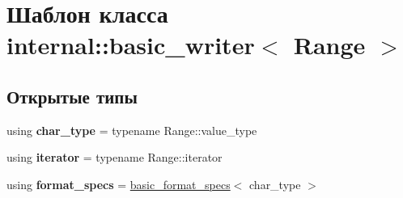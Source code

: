 \hypertarget{classinternal_1_1basic__writer}{}\section{Шаблон класса internal\+:\+:basic\+\_\+writer$<$ Range $>$}
\label{classinternal_1_1basic__writer}
\subsection*{Открытые типы}
\begin{DoxyCompactItemize}
\item 
\mbox{\label{classinternal_1_1basic__writer_ad37cb594e314912183c91ffcdbc8bd89}} 
using {\bfseries char\+\_\+type} = typename Range\+::value\+\_\+type
\item 
\mbox{\label{classinternal_1_1basic__writer_a90c415286ca4f0dffbfa01027fec634d}} 
using {\bfseries iterator} = typename Range\+::iterator
\item 
\mbox{\label{classinternal_1_1basic__writer_a800392870df4c5e5b6fa375134240819}} 
using {\bfseries format\+\_\+specs} = \hyperlink{structbasic__format__specs}{basic\+\_\+format\+\_\+specs}$<$ char\+\_\+type $>$
\end{DoxyCompactItemize}
